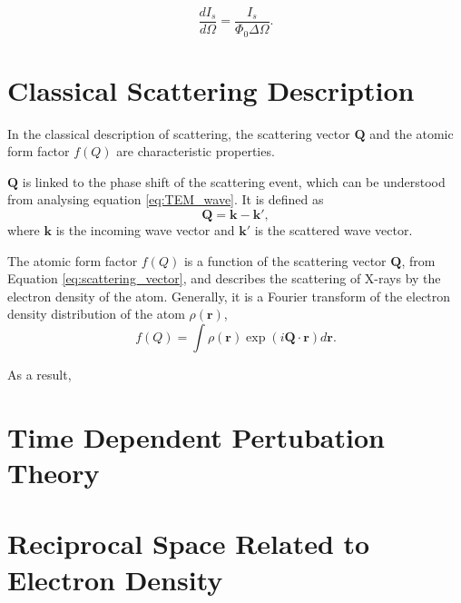 \begin{equation}\label{eq:scattering_crossection}
    \frac{dI_{s}}{d\Omega} = \frac{I_{s}}{\Phi_{0} \Delta\Omega}.
\end{equation}

\section{Classical Scattering Description}

In the classical description of scattering, the scattering vector $\bm{Q}$ and the atomic form factor $f(Q)$ are characteristic properties.

$\bm{Q}$ is linked to the phase shift of the scattering event, which can be understood from analysing equation \ref{eq:TEM_wave}. It is defined as
\begin{equation}\label{eq:scattering_vector}
    \bm{Q} = \bm{k} - \bm{k'},
\end{equation}
where $\bm{k}$ is the incoming wave vector and $\bm{k'}$ is the scattered wave vector.

The atomic form factor $f(Q)$ is a function of the scattering vector $\bm{Q}$, from Equation \eqref{eq:scattering_vector},
and describes the scattering of X-rays by the electron density of the atom.
Generally, it is a Fourier transform of the electron density distribution of the atom $\rho(\bm{r})$,
\begin{equation}
    f(Q) = \int \rho(\bm{r}) \exp\left(i\bm{Q}\cdot\bm{r}\right) d\bm{r}.
\end{equation}

As a result,






\section{Time Dependent Pertubation Theory} %

\section{Reciprocal Space Related to Electron Density}
